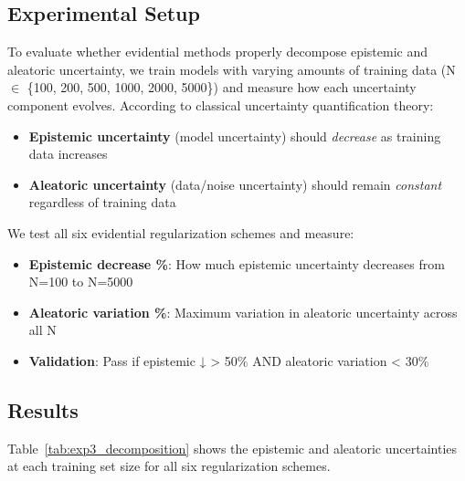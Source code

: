 \subsection{Experimental Setup}

To evaluate whether evidential methods properly decompose epistemic and aleatoric uncertainty, we train models with varying amounts of training data (N $\in$ \{100, 200, 500, 1000, 2000, 5000\}) and measure how each uncertainty component evolves. According to classical uncertainty quantification theory:

\begin{itemize}
\item \textbf{Epistemic uncertainty} (model uncertainty) should \textit{decrease} as training data increases
\item \textbf{Aleatoric uncertainty} (data/noise uncertainty) should remain \textit{constant} regardless of training data
\end{itemize}

We test all six evidential regularization schemes and measure:
\begin{itemize}
\item \textbf{Epistemic decrease \%}: How much epistemic uncertainty decreases from N=100 to N=5000
\item \textbf{Aleatoric variation \%}: Maximum variation in aleatoric uncertainty across all N
\item \textbf{Validation}: Pass if epistemic ↓ > 50\% AND aleatoric variation < 30\%  %
\end{itemize}

\subsection{Results}

Table~\ref{tab:exp3_decomposition} shows the epistemic and aleatoric uncertainties at each training set size for all six regularization schemes.

